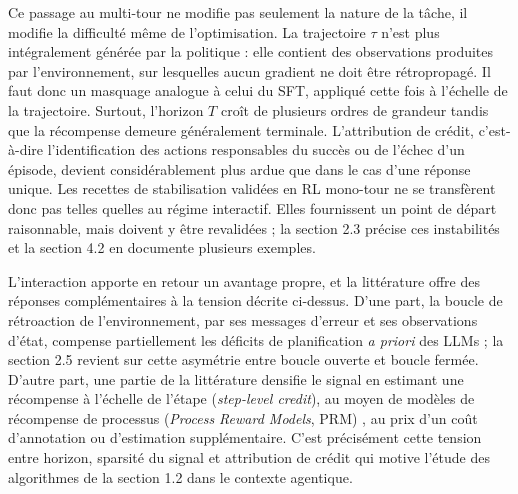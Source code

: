 \documentclass[11pt,a4paper]{article}
\begin{document}
Ce passage au multi-tour ne modifie pas seulement la nature de la tâche, il modifie la difficulté même de l'optimisation. La trajectoire $\tau$ n'est plus intégralement générée par la politique : elle contient des observations produites par l'environnement, sur lesquelles aucun gradient ne doit être rétropropagé. Il faut donc un masquage analogue à celui du SFT, appliqué cette fois à l'échelle de la trajectoire. Surtout, l'horizon $T$ croît de plusieurs ordres de grandeur tandis que la récompense demeure généralement terminale. L'attribution de crédit, c'est-à-dire l'identification des actions responsables du succès ou de l'échec d'un épisode, devient considérablement plus ardue que dans le cas d'une réponse unique. Les recettes de stabilisation validées en RL mono-tour ne se transfèrent donc pas telles quelles au régime interactif. Elles fournissent un point de départ raisonnable, mais doivent y être revalidées ; la section 2.3 précise ces instabilités et la section 4.2 en documente plusieurs exemples.

L'interaction apporte en retour un avantage propre, et la littérature offre des réponses complémentaires à la tension décrite ci-dessus. D'une part, la boucle de rétroaction de l'environnement, par ses messages d'erreur et ses observations d'état, compense partiellement les déficits de planification \emph{a priori} des LLMs \cite{yao2023react, shinn2023reflexion, kambhampati2024llmmodulo} ; la section 2.5 revient sur cette asymétrie entre boucle ouverte et boucle fermée. D'autre part, une partie de la littérature densifie le signal en estimant une récompense à l'échelle de l'étape (\emph{step-level credit}), au moyen de modèles de récompense de processus (\emph{Process Reward Models}, PRM) \cite{lightman2023verify}, au prix d'un coût d'annotation ou d'estimation supplémentaire. C'est précisément cette tension entre horizon, sparsité du signal et attribution de crédit qui motive l'étude des algorithmes de la section 1.2 dans le contexte agentique.
\end{document}

